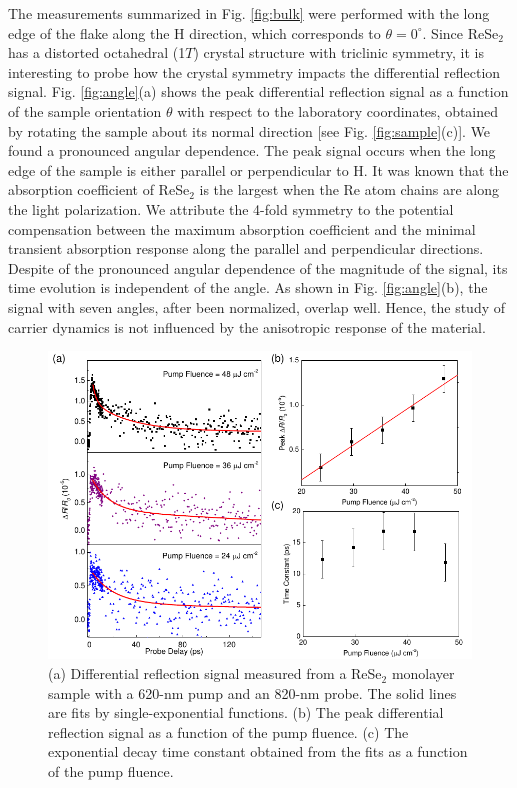 \documentclass{osa-article}
\begin{document}
The measurements summarized in Fig. \ref{fig:bulk} were performed with the long edge of the flake along the H direction, which corresponds to $\theta = 0^\circ$. Since ReSe$_2$ has a distorted octahedral (1$T$) crystal structure with triclinic symmetry, it is interesting to probe how the crystal symmetry impacts the differential reflection signal. Fig. \ref{fig:angle}(a) shows the peak differential reflection signal as a function of the sample orientation $\theta$ with respect to the laboratory coordinates, obtained by rotating the sample about its normal direction [see Fig. \ref{fig:sample}(c)]. We found a pronounced angular dependence. The peak signal occurs when the long edge of the sample is either parallel or perpendicular to H. It was known that the absorption coefficient of ReSe$_2$ is the largest when the Re atom chains are along the light polarization. We attribute the 4-fold symmetry to the potential compensation between the maximum absorption coefficient and the minimal transient absorption response along the parallel and perpendicular directions. Despite of the pronounced angular dependence of the magnitude of the signal, its time evolution is independent of the angle. As shown in Fig. \ref{fig:angle}(b), the signal with seven angles, after been normalized, overlap well. Hence, the study of carrier dynamics is not influenced by the anisotropic response of the material.




\begin{figure}
  \centering
  \includegraphics[width=12cm]{ml.pdf}
  \caption{(a) Differential reflection signal measured from a ReSe$_2$ monolayer sample with a 620-nm pump and an 820-nm probe. The solid lines are fits by single-exponential functions. (b) The peak differential reflection signal as a function of the pump fluence. (c) The exponential decay time constant obtained from the fits as a function of the pump fluence.}
    \label{fig:ml}
\end{figure}
\end{document}
